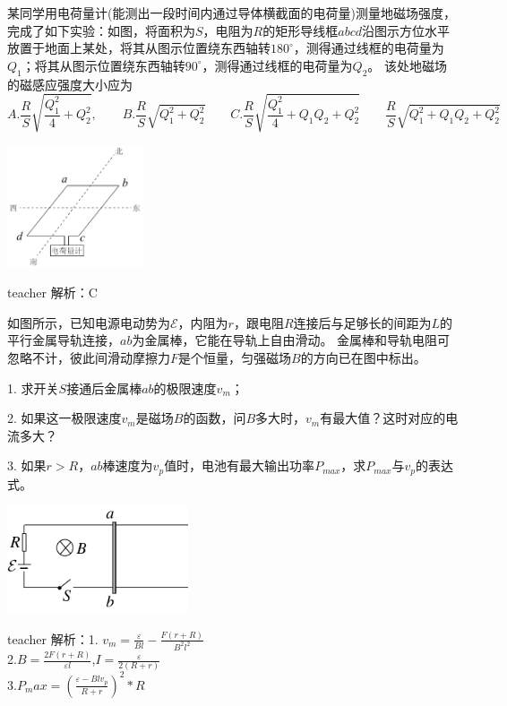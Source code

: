 \begin{example}

某同学用电荷量计(能测出一段时间内通过导体横截面的电荷量)测量地磁场强度，完成了如下实验：如图，将面积为$S$，电阻为$R$的矩形导线框$abcd$沿图示方位水平放置于地面上某处，将其从图示位置绕东西轴转$180^\circ$，测得通过线框的电荷量为$Q_1$；将其从图示位置绕东西轴转$90^\circ$，测得通过线框的电荷量为$Q_2$。
该处地磁场的磁感应强度大小应为
\[
A. \frac{R}{S}\sqrt{\frac{Q_1^2}{4}+Q_2^2},\qquad B. \frac{R}{S}\sqrt{Q_1^2+Q_2^2}\qquad C. \frac{R}{S}\sqrt{\frac{Q_1^2}{4}+Q_1Q_2+Q_2^2}\qquad \frac{R}{S}\sqrt{Q_1^2+Q_1Q_2+Q_2^2}
\]
\begin{flushright}
\includegraphics[width = 0.3\textwidth]{images/mag-32.pdf} 
\end{flushright}
\begin{taggedblock}{teacher}
\noindent
解析：C
\end{taggedblock}
\end{example}


\begin{example}
如图所示，已知电源电动势为$\mathcal{E}$，内阻为$r$，跟电阻$R$连接后与足够长的间距为$L$的平行金属导轨连接，$ab$为金属棒，它能在导轨上自由滑动。
金属棒和导轨电阻可忽略不计，彼此间滑动摩擦力$F$是个恒量，匀强磁场$B$的方向已在图中标出。

1. 求开关$S$接通后金属棒$ab$的极限速度$v_{m}$；

2. 如果这一极限速度$v_{m}$是磁场$B$的函数，问$B$多大时，$v_{m}$有最大值？这时对应的电流多大？

3. 如果$r>R$，$ab$棒速度为$v_p$值时，电池有最大输出功率$P_{max}$，求$P_{max}$与$v_p$的表达式。
\begin{flushright}
\includegraphics[width=0.4\textwidth]{images/mag-25.pdf}
\end{flushright}
\begin{taggedblock}{teacher}
\noindent
解析：1. $v_m=\frac{\varepsilon}{Bl}-\frac{F(r+R)}{B^2l^2}$
\\2.$B=\frac{2F(r+R)}{\varepsilon l}$,$I=\frac{\varepsilon}{2(R+r)}$
\\3.$P_max=(\frac{\varepsilon-Blv_p}{R+r})^2*R$
\end{taggedblock}
\end{example}

